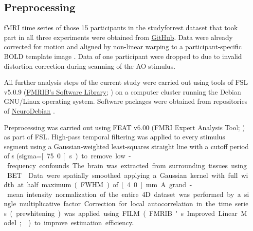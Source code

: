 \documentclass[english]{article}
\begin{document}
\subsection{Preprocessing}



fMRI time series of those 15 participants in the studyforrest dataset that took
part in all three experiments were obtained from
\href{https://github.com/psychoinformatics-de/studyforrest-data-aligned}{GitHub}.
Data were already corrected for motion and aligned by non-linear warping to a
participant-specific BOLD template image \citep{sengupta2016extension}.
Data of one participant were dropped to due to invalid distortion correction
during scanning of the AO stimulus.

All further analysis steps of the current study were carried out using tools of
FSL v5.0.9 (\href{https://www.fmrib.ox.ac.uk/fsl}{FMRIB's Software Library};
\citep{smith2004fsl}) on a computer cluster running the Debian GNU/Linux
operating system. Software packages were obtained from repositories of
\href{http://neuro.debian.net}{NeuroDebian} \citep{halchenko2012open}.

Preprocessing was carried out using FEAT v6.00 (FMRI Expert Analysis Tool;
\citep{woolrich2001autocorr}) as part of FSL.
High-pass temporal filtering was applied to every stimulus segment using a
Gaussian-weighted least-squares straight line with a cutoff period of
\unit[150]{s} (sigma=\unit[75.0]{s}) to remove low-frequency confounds.
The brain was extracted from surrounding tissues using BET \citep{smith2002bet}.
Data were spatially smoothed applying a Gaussian kernel with full width at half
maximum (FWHM) of \unit[4.0]{mm}.
A grand-mean intensity normalization of the entire 4D dataset was performed by a
single multiplicative factor.
Correction for local autocorrelation in the time series (prewhitening) was
applied using FILM (FMRIB's Improved Linear Model; \citep{woolrich2001autocorr})
to improve estimation efficiency.
\end{document}
